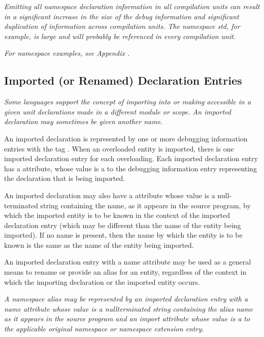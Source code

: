 \textit{Emitting all namespace declaration information in all
compilation units can result in a significant increase in the
size of the debug information and significant duplication of
information across compilation units. 
The  namespace std,
for example, 
is large and will probably be referenced in
every  compilation unit.
}

\textit{For  namespace examples, 
see Appendix .
}


\subsection{Imported (or Renamed) Declaration Entries} 
\label{chap:importedorrenameddeclarationentries}
\textit{Some languages support the concept of importing into or making
accessible in a given unit declarations made in a different
module or scope. An imported declaration may sometimes be
given another name.
}

An 
imported declaration is represented by one or
more debugging information entries with the 
tag \DWTAGimporteddeclarationTARG. 
When 
\hypertarget{chap:DWATimportimporteddeclaration}{}
an overloaded entity
is imported, there is one imported declaration entry for
each overloading. 
Each imported declaration entry has a
\DWATimport{} attribute,
whose value is a  to the
debugging information entry representing the declaration that
is being imported.

An imported declaration may also have a 
\DWATname{}
attribute
whose value is a null-terminated string containing the
name, as it appears in the source program, by which the
imported entity is to be known in the context of the imported
declaration entry (which may be different than the name of
the entity being imported). If no name is present, then the
name by which the entity is to be known is the same as the
name of the entity being imported.

An imported declaration entry with a name attribute may be
used as a general means to rename or provide an alias for
an entity, regardless of the context in which the importing
declaration or the imported entity occurs.

\textit{A  namespace alias may be represented by an imported
\hypertarget{chap:DWATimportnamespacealias}{}
declaration entry 
with a name attribute whose value is
a null\dash terminated string containing the alias name as it
appears in the source program and an import attribute whose
value is a  to the applicable original namespace or
namespace extension entry.
}

